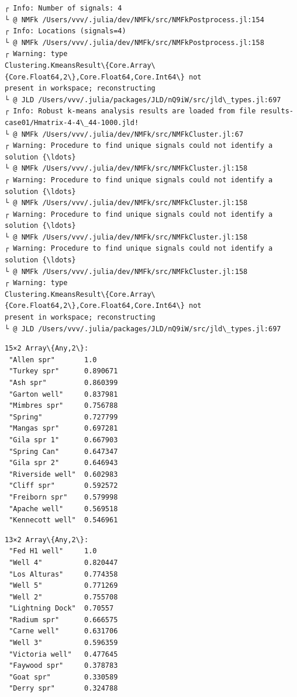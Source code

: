 \documentclass[11pt]{article}
\begin{document}
    \begin{Verbatim}[commandchars=\\\{\}]
┌ Info: Number of signals: 4
└ @ NMFk /Users/vvv/.julia/dev/NMFk/src/NMFkPostprocess.jl:154
┌ Info: Locations (signals=4)
└ @ NMFk /Users/vvv/.julia/dev/NMFk/src/NMFkPostprocess.jl:158
┌ Warning: type
Clustering.KmeansResult\{Core.Array\{Core.Float64,2\},Core.Float64,Core.Int64\} not
present in workspace; reconstructing
└ @ JLD /Users/vvv/.julia/packages/JLD/nQ9iW/src/jld\_types.jl:697
┌ Info: Robust k-means analysis results are loaded from file results-
case01/Hmatrix-4-4\_44-1000.jld!
└ @ NMFk /Users/vvv/.julia/dev/NMFk/src/NMFkCluster.jl:67
┌ Warning: Procedure to find unique signals could not identify a solution {\ldots}
└ @ NMFk /Users/vvv/.julia/dev/NMFk/src/NMFkCluster.jl:158
┌ Warning: Procedure to find unique signals could not identify a solution {\ldots}
└ @ NMFk /Users/vvv/.julia/dev/NMFk/src/NMFkCluster.jl:158
┌ Warning: Procedure to find unique signals could not identify a solution {\ldots}
└ @ NMFk /Users/vvv/.julia/dev/NMFk/src/NMFkCluster.jl:158
┌ Warning: Procedure to find unique signals could not identify a solution {\ldots}
└ @ NMFk /Users/vvv/.julia/dev/NMFk/src/NMFkCluster.jl:158
┌ Warning: type
Clustering.KmeansResult\{Core.Array\{Core.Float64,2\},Core.Float64,Core.Int64\} not
present in workspace; reconstructing
└ @ JLD /Users/vvv/.julia/packages/JLD/nQ9iW/src/jld\_types.jl:697
    \end{Verbatim}


    \begin{Verbatim}[commandchars=\\\{\}]
15×2 Array\{Any,2\}:
 "Allen spr"       1.0
 "Turkey spr"      0.890671
 "Ash spr"         0.860399
 "Garton well"     0.837981
 "Mimbres spr"     0.756788
 "Spring"          0.727799
 "Mangas spr"      0.697281
 "Gila spr 1"      0.667903
 "Spring Can"      0.647347
 "Gila spr 2"      0.646943
 "Riverside well"  0.602983
 "Cliff spr"       0.592572
 "Freiborn spr"    0.579998
 "Apache well"     0.569518
 "Kennecott well"  0.546961
    \end{Verbatim}



    \begin{Verbatim}[commandchars=\\\{\}]
13×2 Array\{Any,2\}:
 "Fed H1 well"     1.0
 "Well 4"          0.820447
 "Los Alturas"     0.774358
 "Well 5"          0.771269
 "Well 2"          0.755708
 "Lightning Dock"  0.70557
 "Radium spr"      0.666575
 "Carne well"      0.631706
 "Well 3"          0.596359
 "Victoria well"   0.477645
 "Faywood spr"     0.378783
 "Goat spr"        0.330589
 "Derry spr"       0.324788
    \end{Verbatim}
\end{document}
